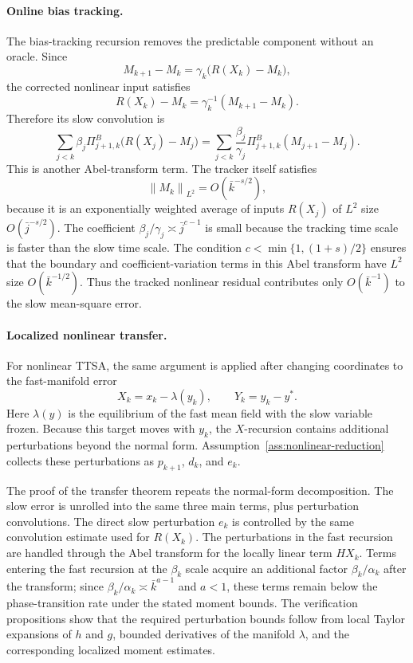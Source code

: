 \documentclass{article}
\newcommand{\norm}[1]{\left\lVert #1\right\rVert}
\begin{document}
\paragraph{Online bias tracking.}
The bias-tracking recursion removes the predictable component without an oracle. Since
\[
  M_{k+1}-M_k=\gamma_k\big(R(X_k)-M_k\big),
\]
the corrected nonlinear input satisfies
\[
  R(X_k)-M_k=\gamma_k^{-1}(M_{k+1}-M_k).
\]
Therefore its slow convolution is
\[
  \sum_{j<k}\beta_j\Pi^B_{j+1,k}\big(R(X_j)-M_j\big)
  =
  \sum_{j<k}\frac{\beta_j}{\gamma_j}\Pi^B_{j+1,k}(M_{j+1}-M_j).
\]
This is another Abel-transform term. The tracker itself satisfies
\[
  \norm{M_k}_{L^2}=O(\bar k^{-s/2}),
\]
because it is an exponentially weighted average of inputs $R(X_j)$ of $L^2$ size $O(\bar j^{-s/2})$. The coefficient $\beta_j/\gamma_j\asymp \bar j^{c-1}$ is small because the tracking time scale is faster than the slow time scale. The condition $c<\min\{1,(1+s)/2\}$ ensures that the boundary and coefficient-variation terms in this Abel transform have $L^2$ size $O(\bar k^{-1/2})$. Thus the tracked nonlinear residual contributes only $O(\bar k^{-1})$ to the slow mean-square error.

\paragraph{Localized nonlinear transfer.}
For nonlinear TTSA, the same argument is applied after changing coordinates to the fast-manifold error
\[
  X_k=x_k-\lambda(y_k),
  \qquad
  Y_k=y_k-y^*.
\]
Here $\lambda(y)$ is the equilibrium of the fast mean field with the slow variable frozen. Because this target moves with $y_k$, the $X$-recursion contains additional perturbations beyond the normal form. Assumption~\ref{ass:nonlinear-reduction} collects these perturbations as $p_{k+1}$, $d_k$, and $e_k$.

The proof of the transfer theorem repeats the normal-form decomposition. The slow error is unrolled into the same three main terms, plus perturbation convolutions. The direct slow perturbation $e_k$ is controlled by the same convolution estimate used for $R(X_k)$. The perturbations in the fast recursion are handled through the Abel transform for the locally linear term $HX_k$. Terms entering the fast recursion at the $\beta_k$ scale acquire an additional factor $\beta_k/\alpha_k$ after the transform; since $\beta_k/\alpha_k\asymp \bar k^{a-1}$ and $a<1$, these terms remain below the phase-transition rate under the stated moment bounds. The verification propositions show that the required perturbation bounds follow from local Taylor expansions of $h$ and $g$, bounded derivatives of the manifold $\lambda$, and the corresponding localized moment estimates.
\end{document}

